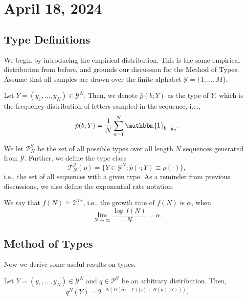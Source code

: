 \section{April 18, 2024}

\subsection{Type Definitions}

We begin by introducing the empirical distribution. This is the same empirical distribution from before, and grounds our discussion for the Method of Types. Assume that all samples are drawn over the finite alphabet $\mathcal{Y}=\{1,\hdots,M\}$. 
\begin{definition}

Let $Y=(y_1,\hdots,y_N)\in \mathcal{Y}^N$. Then, we denote $\hat{p}(b; Y)$ as the \ac{type} of $Y$, which is the frequency distribution of letters sampled in the sequence, i.e., 
\[\hat{p}(b; Y) = \frac{1}{N}\sum_{n=1}^N \mathbbm{1}_{b=y_n}.\] 
\end{definition}

We let $\mathcal{P}_N^{\mathcal{Y}}$ be the set of all possible types over all length $N$ sequences generated from $\mathcal{Y}$. Further, we define the \ac{type class}
\[\mathcal{T}_N^{\mathcal{Y}}(p) = \{Y\in \mathcal{Y}^N: \hat{p}(\cdot; Y) \equiv p(\cdot)\},\]
i.e., the set of all sequences with a given type. As a reminder from previous discussions, we also define the exponential rate notation: 
\begin{definition}

We say that $f(N)\overset{\cdot}{=} 2^{N\alpha}$, i.e., the growth rate of $f(N)$ is $\alpha$, when 
\[\lim_{N\rightarrow \infty}\frac{\log f(N)}{N} = \alpha.\] 
\end{definition}

\subsection{Method of Types}

Now we derive some useful results on types. 

\begin{theorem}
\lemlabel

Let $Y=(y_1,\hdots,y_N)\in \mathcal{Y}^N$ and $q\in \mathcal{P}^{\mathcal{Y}}$ be an arbitrary distribution. Then, 
\[q^N(Y) = 2^{-N(D(\hat{p}(\cdot; Y)\Vert q) + H(\hat{p}(\cdot; Y)))}.\] 
\end{theorem}

